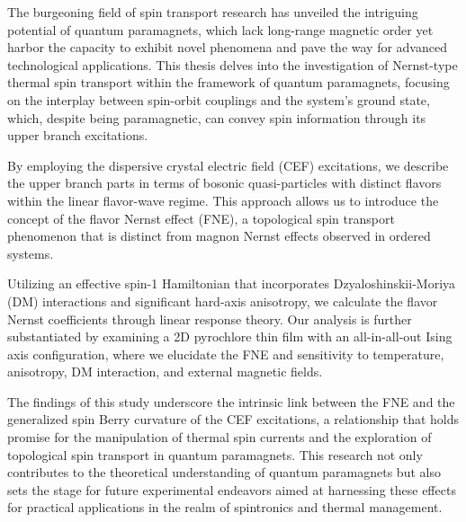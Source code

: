 \documentclass[type=master]{fduthesis}
\begin{document}
\begin{abstract*}
  The burgeoning field of spin transport research has unveiled the intriguing potential of quantum paramagnets, which lack long-range magnetic order yet harbor the capacity to exhibit novel phenomena and pave the way for advanced technological applications. This thesis delves into the investigation of Nernst-type thermal spin transport within the framework of quantum paramagnets, focusing on the interplay between spin-orbit couplings and the system's ground state, which, despite being paramagnetic, can convey spin information through its upper branch excitations.
  
  By employing the dispersive crystal electric field (CEF) excitations, we describe the upper branch parts in terms of bosonic quasi-particles with distinct flavors within the linear flavor-wave regime. This approach allows us to introduce the concept of the flavor Nernst effect (FNE), a topological spin transport phenomenon that is distinct from magnon Nernst effects observed in ordered systems.
  
  Utilizing an effective spin-1 Hamiltonian that incorporates Dzyaloshinskii-Moriya (DM) interactions and significant hard-axis anisotropy, we calculate the flavor Nernst coefficients through linear response theory. Our analysis is further substantiated by examining a 2D pyrochlore thin film with an all-in-all-out Ising axis configuration, where we elucidate the FNE and sensitivity to temperature, anisotropy, DM interaction, and external magnetic fields.
  
  The findings of this study underscore the intrinsic link between the FNE and the generalized spin Berry curvature of the CEF excitations, a relationship that holds promise for the manipulation of thermal spin currents and the exploration of topological spin transport in quantum paramagnets. This research not only contributes to the theoretical understanding of quantum paramagnets but also sets the stage for future experimental endeavors aimed at harnessing these effects for practical applications in the realm of spintronics and thermal management.
\end{abstract*}

\end{document}
